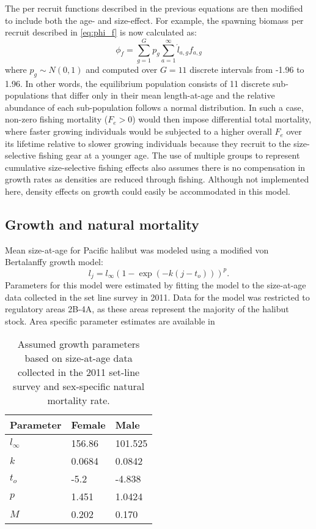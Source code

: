 \documentclass[12pt,leqno]{article}
\begin{document}
The per recruit functions described in the previous equations are then modified to include both the age- and size-effect.  For example, the spawning biomass per recruit described in \eqref{eq:phi_f} is now calculated as:
\begin{equation}
	\phi_{f} =\sum_{g=1}^G p_g \sum_{a=1}^\infty \acute{l}_{a,g} f_{a,g}\label{eq:phi_fg}
\end{equation}
where $p_g \sim N(0,1)$ and computed over $G=11$ discrete intervals from -1.96 to 1.96.  In other words, the equilibrium population consists of 11 discrete sub-populations that differ only in their mean length-at-age and the relative abundance of each sub-population follows a normal distribution.  In such a case, non-zero fishing mortality  ($F_e>0$) would then impose differential total mortality, where faster growing individuals would be subjected to a higher overall $F_e$ over its lifetime relative to slower growing individuals because they recruit to the size-selective fishing gear at a younger age.  The use of multiple groups to represent cumulative size-selective fishing effects also assumes there is no compensation in growth rates as densities are reduced through fishing. Although not implemented here, density effects on growth could easily be accommodated in this model.

\subsection*{Growth and natural mortality}
Mean size-at-age for Pacific halibut was modeled using a modified von Bertalanffy growth model:
\begin{equation}
	l_j = l_\infty (1 - \exp(-k(j-t_o)))^p.	
\end{equation}
Parameters for this model were estimated by fitting the model to the size-at-age data collected in the set line survey in 2011.  Data for the model was restricted to regulatory areas 2B-4A, as these areas represent the majority of the halibut stock. Area specific parameter estimates are available in \cite{martell2013:ohr}

\begin{table}
\begin{center}
	
	\caption{Assumed growth parameters based on size-at-age data collected in the 2011 set-line survey and sex-specific natural mortality rate.} \label{tab:Parameters}
	\begin{tabular}{lll}
	\hline
	 Parameter & Female  & Male\\
	 \hline
	 $l_\infty$ & 156.86 & 101.525\\
	 $k$   & 0.0684	& 0.0842\\
	 $t_o$ & -5.2  & -4.838\\
	 $p$ & 1.451 & 1.0424\\
	 $M$ & 0.202 & 0.170\\
	 \hline 
	\end{tabular}
\end{center}
\end{table}
\end{document}
